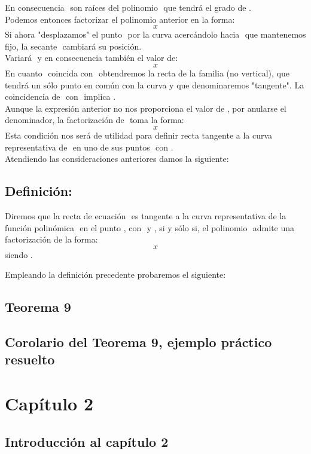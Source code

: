 \documentclass[12pt]{article}
\begin{document}
En consecuencia $ $ son raíces del polinomio $ $ que tendrá el grado de $ $.\\
Podemos entonces factorizar el polinomio anterior en la forma:
$$
  x
$$
Si ahora "desplazamos" el punto $ $ por la curva acercándolo hacia $ $ que mantenemos fijo, la secante $ $ cambiará su posición.\\
Variará $ $ y en consecuencia también el valor de:
$$
  x
$$
En cuanto $ $ coincida con $ $ obtendremos la recta de la familia (no vertical), que tendrá un sólo punto en común con la curva y que denominaremos "tangente". La coincidencia de $ $ con $ $ implica $ $.\\
Aunque la expresión anterior no nos proporciona el valor de $ $, por anularse el denominador, la factorización de $ $ toma la forma:
$$
  x
$$
Esta condición nos será de utilidad para definir recta tangente a la curva representativa de $ $ en uno de sus puntos $ $ con $ $.\\
Atendiendo las consideraciones anteriores damos la siguiente:

\subsection*{Definición:}
Diremos que la recta de ecuación $ $ es tangente a la curva representativa de la función polinómica $ $ en el punto $ $, con $ $ y $ $, si y sólo si, el polinomio $ $ admite una factorización de la forma:
$$
  x
$$
siendo $ $.

Empleando la definición precedente probaremos el siguiente:

\subsection{
  Teorema 9
}
\lipsum[2]

\subsection{
  Corolario del Teorema 9, ejemplo práctico resuelto
}
\lipsum[2]

\section{Capítulo 2}
\lipsum[2]

\subsection{Introducción al capítulo 2}
\lipsum[2]
\end{document}
